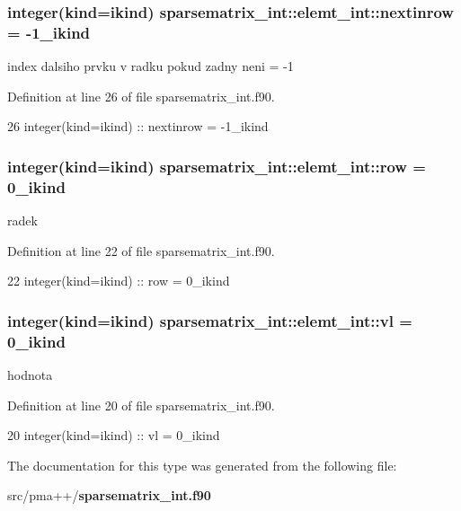 \subsubsection[{nextinrow}]{\setlength{\rightskip}{0pt plus 5cm}integer(kind=ikind) sparsematrix\+\_\+int\+::elemt\+\_\+int\+::nextinrow = -\/1\+\_\+ikind}\label{structsparsematrix__int_1_1elemt__int_aeb04851802e93c3eb3d1ca09e5788f25}


index dalsiho prvku v radku pokud zadny neni = -\/1 



Definition at line 26 of file sparsematrix\+\_\+int.\+f90.


\begin{DoxyCode}
26         \textcolor{keywordtype}{integer(kind=ikind)} :: nextinrow = -1\_ikind
\end{DoxyCode}
\subsubsection[{row}]{\setlength{\rightskip}{0pt plus 5cm}integer(kind=ikind) sparsematrix\+\_\+int\+::elemt\+\_\+int\+::row = 0\+\_\+ikind}\label{structsparsematrix__int_1_1elemt__int_ac8675da0e814926afed99285bffbe05a}


radek 



Definition at line 22 of file sparsematrix\+\_\+int.\+f90.


\begin{DoxyCode}
22         \textcolor{keywordtype}{integer(kind=ikind)} :: row = 0\_ikind
\end{DoxyCode}
\subsubsection[{vl}]{\setlength{\rightskip}{0pt plus 5cm}integer(kind=ikind) sparsematrix\+\_\+int\+::elemt\+\_\+int\+::vl = 0\+\_\+ikind}\label{structsparsematrix__int_1_1elemt__int_acbb6a32645167ebf98a4a148410c76b4}


hodnota 



Definition at line 20 of file sparsematrix\+\_\+int.\+f90.


\begin{DoxyCode}
20         \textcolor{keywordtype}{integer(kind=ikind)} :: vl = 0\_ikind
\end{DoxyCode}


The documentation for this type was generated from the following file\+:\begin{DoxyCompactItemize}
\item 
src/pma++/{\bf sparsematrix\+\_\+int.\+f90}\end{DoxyCompactItemize}
